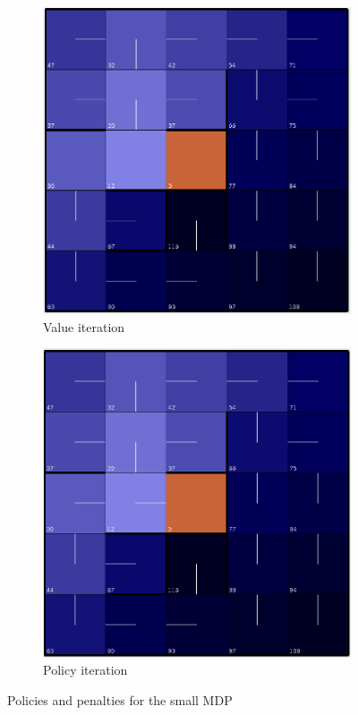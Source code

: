 \documentclass[letterpaper]{article}
\begin{document}
	\begin{figure}
		\centering
		\begin{subfigure}{.45\textwidth}
			\centering
			\includegraphics[width=\linewidth]{images/small_vi}
			\caption{Value iteration}
		\end{subfigure}
		\begin{subfigure}{.45\textwidth}
			\centering
			\includegraphics[width=\linewidth]{images/small_pi}
			\caption{Policy iteration}		
		\end{subfigure}
		\caption{Policies and penalties for the small MDP}
		\label{fig:mdp-viz-small}%
	\end{figure}%
\end{document}
